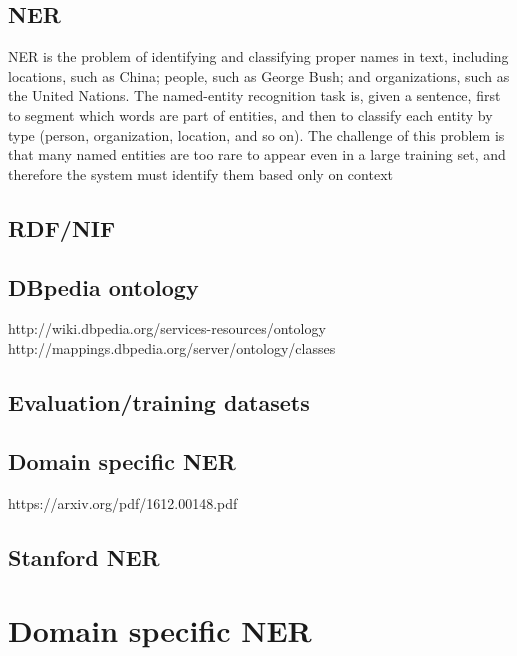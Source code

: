 \documentclass[thesis=M,english]{FITthesis}[2018/05/30]
\begin{document}
\section{NER}
NER is the problem of identifying and classifying proper names in text, including locations, such as China; people, such as George Bush; and organizations, such as the United Nations. The named-entity recognition task is, given a sentence, first to segment which words are part of entities, and then to classify each entity by type (person, organization, location, and so on). The challenge of this problem is that many named entities are too rare to appear even in a large training set, and therefore the system must identify them based only on context
\section{RDF/NIF}

\section{DBpedia ontology}
http://wiki.dbpedia.org/services-resources/ontology
http://mappings.dbpedia.org/server/ontology/classes

\section{Evaluation/training datasets}

\section{Domain specific NER}
https://arxiv.org/pdf/1612.00148.pdf

\section{Stanford NER}

\chapter{Domain specific NER}\label{}
\end{document}
